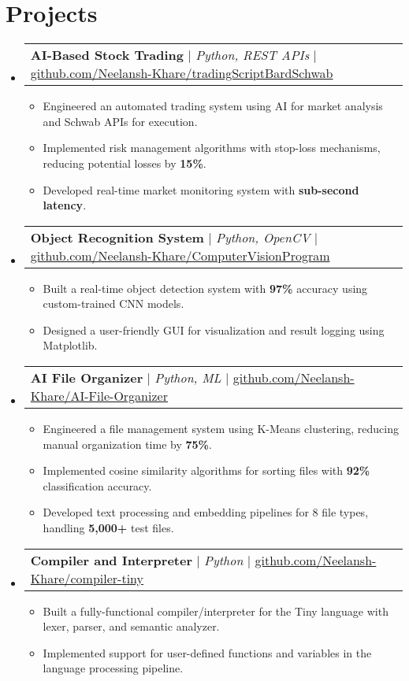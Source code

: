 \documentclass[letterpaper,11pt]{article}
\makeatletter
\newcommand{\resumeItem}[1]{
  \item\small{
    {#1 \vspace{-1pt}}
  }
}
\newcommand{\resumeProjectHeading}[2]{
    \item
    \begin{tabular*}{0.97\textwidth}{l@{\extracolsep{\fill}}r}
      \small#1 & #2 \\
    \end{tabular*}\vspace{-5pt}
}
\newcommand{\resumeSubHeadingListStart}{\begin{itemize}[leftmargin=0.15in, label={}]}
\newcommand{\resumeSubHeadingListEnd}{\end{itemize}}
\newcommand{\resumeItemListStart}{\begin{itemize}}
\newcommand{\resumeItemListEnd}{\end{itemize}\vspace{-5pt}}
\makeatother
\begin{document}
\section{Projects}
\resumeSubHeadingListStart
\resumeProjectHeading
    {\textbf{AI-Based Stock Trading} $|$ \emph{Python, REST APIs} $|$ \color{blue}\href{https://github.com/Neelansh-Khare/tradingScriptBardSchwab}{{github.com/Neelansh-Khare/tradingScriptBardSchwab}}}{}
      \resumeItemListStart
        \resumeItem{Engineered an automated trading system using AI for market analysis and Schwab APIs for execution.}
        \resumeItem{Implemented risk management algorithms with stop-loss mechanisms, reducing potential losses by \textbf{15\%}.}
        \resumeItem{Developed real-time market monitoring system with \textbf{sub-second latency}.}
      \resumeItemListEnd
\resumeProjectHeading
    {\textbf{Object Recognition System} $|$ \emph{Python, OpenCV} $|$ \color{blue}\href{https://github.com/Neelansh-Khare/ComputerVisionProgram}{{github.com/Neelansh-Khare/ComputerVisionProgram}}}{}
      \resumeItemListStart
        \resumeItem{Built a real-time object detection system with \textbf{97\%} accuracy using custom-trained CNN models.}
        \resumeItem{Designed a user-friendly GUI for visualization and result logging using Matplotlib.}
      \resumeItemListEnd
\resumeProjectHeading
    {\textbf{AI File Organizer} $|$ \emph{Python, ML} $|$ \color{blue}\href{https://github.com/Neelansh-Khare/AI-File-Organizer}{{github.com/Neelansh-Khare/AI-File-Organizer}}}{}
      \resumeItemListStart
        \resumeItem{Engineered a file management system using K-Means clustering, reducing manual organization time by \textbf{75\%}.}
        \resumeItem{Implemented cosine similarity algorithms for sorting files with \textbf{92\%} classification accuracy.}
        \resumeItem{Developed text processing and embedding pipelines for 8 file types, handling \textbf{5,000+} test files.}
      \resumeItemListEnd
\resumeProjectHeading
    {\textbf{Compiler and Interpreter} $|$ \emph{Python} $|$ \color{blue}\href{https://github.com/Neelansh-Khare/compiler-tiny}{{github.com/Neelansh-Khare/compiler-tiny}}}{}
      \resumeItemListStart
        \resumeItem{Built a fully-functional compiler/interpreter for the Tiny language with lexer, parser, and semantic analyzer.}
        \resumeItem{Implemented support for user-defined functions and variables in the language processing pipeline.}
      \resumeItemListEnd
\resumeSubHeadingListEnd
\end{document}
